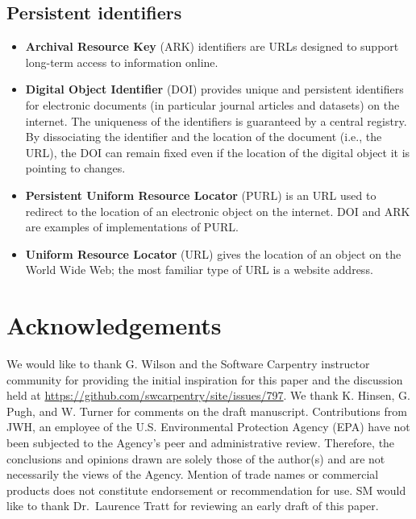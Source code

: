 \documentclass[10pt,letterpaper]{article}
\begin{document}
\subsection*{Persistent identifiers}\label{persistent-identifiers}

\begin{itemize}
\item
  \textbf{Archival Resource Key} (ARK) identifiers are URLs designed to
  support long-term access to information online.
\item
  \textbf{Digital Object Identifier} (DOI) provides unique and
  persistent identifiers for electronic documents (in particular journal
  articles and datasets) on the internet. The uniqueness of the
  identifiers is guaranteed by a central registry. By dissociating the
  identifier and the location of the document (i.e., the URL), the DOI
  can remain fixed even if the location of the digital object it is
  pointing to changes.
\item
  \textbf{Persistent Uniform Resource Locator} (PURL) is an URL used to
  redirect to the location of an electronic object on the internet. DOI
  and ARK are examples of implementations of PURL.
\item
  \textbf{Uniform Resource Locator} (URL) gives the location of an
  object on the World Wide Web; the most familiar type of URL is a
  website address.
\end{itemize}

\section*{Acknowledgements}\label{acknowledgements}

We would like to thank G. Wilson and the Software Carpentry instructor
community for providing the initial inspiration for this paper and the
discussion held at \url{https://github.com/swcarpentry/site/issues/797}.
We thank K. Hinsen, G. Pugh, and W. Turner for comments on the draft
manuscript. Contributions from JWH, an employee of the U.S.
Environmental Protection Agency (EPA) have not been subjected to the
Agency's peer and administrative review. Therefore, the conclusions and
opinions drawn are solely those of the author(s) and are not necessarily
the views of the Agency. Mention of trade names or commercial products
does not constitute endorsement or recommendation for use. SM would like
to thank Dr.~Laurence Tratt for reviewing an early draft of this paper.
\end{document}
